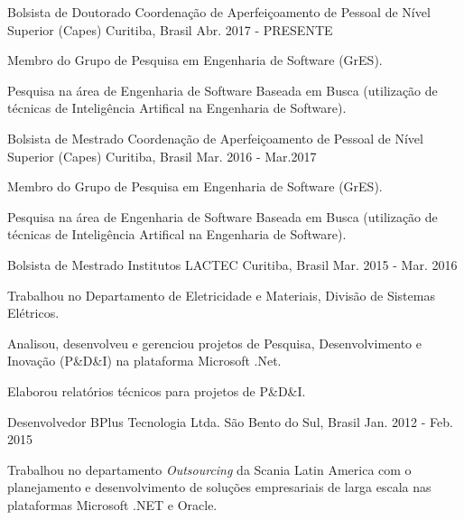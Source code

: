 \begin{cventries}
   \cventry
	{Bolsista de Doutorado} %
	{Coordenação de Aperfeiçoamento de Pessoal de Nível Superior (Capes)} %
	{Curitiba, Brasil} %
	{Abr. 2017 - PRESENTE} %
	{
	    \begin{cvitems} %
        \item {Membro do Grupo de Pesquisa em Engenharia de Software (GrES).}
        \item{Pesquisa na área de Engenharia de Software Baseada em Busca (utilização de técnicas de Inteligência Artifical na Engenharia de Software).}
      \end{cvitems}
	}
  \cventry
    {Bolsista de Mestrado} %
    {Coordenação de Aperfeiçoamento de Pessoal de Nível Superior (Capes)} %
    {Curitiba, Brasil} %
    {Mar. 2016 - Mar.2017} %
    {
      \begin{cvitems} %
        \item {Membro do Grupo de Pesquisa em Engenharia de Software (GrES).}
        \item{Pesquisa na área de Engenharia de Software Baseada em Busca (utilização de técnicas de Inteligência Artifical na Engenharia de Software).}
      \end{cvitems}
    }

  \cventry
    {Bolsista de Mestrado} %
    {Institutos LACTEC} %
    {Curitiba, Brasil} %
    {Mar. 2015 - Mar. 2016} %
    {
      \begin{cvitems} %
        \item {Trabalhou no Departamento de Eletricidade e Materiais, Divisão de Sistemas Elétricos.}
        \item {Analisou, desenvolveu e gerenciou projetos de Pesquisa, Desenvolvimento e Inovação (P\&D\&I) na plataforma Microsoft .Net.}
        \item {Elaborou relatórios técnicos para projetos de P\&D\&I.}
      \end{cvitems}
    }

  \cventry
    {Desenvolvedor} %
    {BPlus Tecnologia Ltda.} %
    {São Bento do Sul, Brasil} %
    {Jan. 2012 - Feb. 2015} %
    {
      \begin{cvitems} %
        \item {Trabalhou no departamento \textit{Outsourcing} da Scania Latin America com o planejamento e desenvolvimento de soluções empresariais de larga escala nas plataformas Microsoft .NET e Oracle.}
      \end{cvitems}
    }
\end{cventries}
